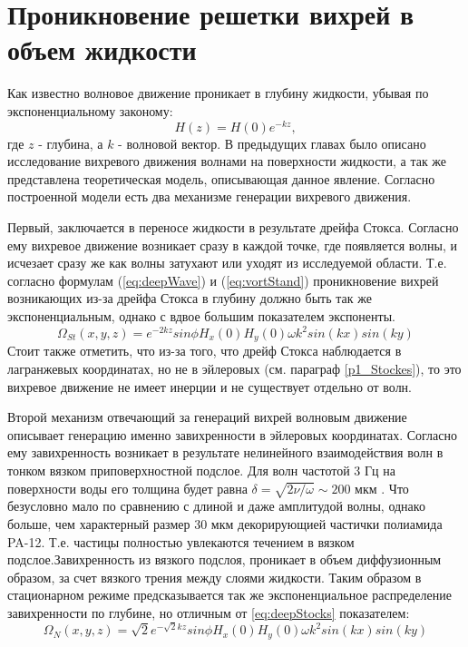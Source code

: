 \chapter{Проникновение решетки вихрей в объем жидкости} \label{chapt6}

Как известно \cite{land} волновое движение проникает в глубину жидкости, убывая по экспоненциальному законому:
\begin{equation}
 \label{eq:deepWave}
H(z) = H(0) e^{-kz},
\end{equation}
 где $z$ - глубина, а $k$ - волновой вектор. 
 В предыдущих главах было описано исследование вихревого движения волнами на поверхности жидкости, а так же представлена теоретическая модель, описывающая данное явление.
Согласно построенной модели есть два механизме генерации вихревого движения. 

	Первый, заключается в переносе жидкости в результате дрейфа Стокса. Согласно ему вихревое движение возникает сразу в каждой точке, где появляется волны, и исчезает сразу же как волны затухают или уходят из исследуемой области. Т.е. согласно формулам (\ref{eq:deepWave}) и (\ref{eq:vortStand}) проникновение вихрей возникающих из-за дрейфа Стокса в глубину должно быть так же экспоненциальным, однако с вдвое большим показателем экспоненты.
\begin{equation}
 \label{eq:deepStocks}
\Omega_{St}(x,y,z)  = e^{-2kz} sin \phi H_x(0) H_y(0) \omega k^2 sin(kx)sin(ky)
\end{equation}
Стоит также отметить, что из-за того, что дрейф Стокса наблюдается в лагранжевых координатах, но не в эйлеровых (см. параграф \ref{p1_Stockes}), то это вихревое движение не имеет инерции и не существует отдельно от волн.

	Второй механизм отвечающий за генераций вихрей волновым движение описывает генерацию именно завихренности в эйлеровых координатах. Согласно ему завихренность возникает в результате нелинейного взаимодействия волн в тонком вязком приповерхностной подслое. Для волн частотой 3 Гц на поверхности воды его толщина будет равна $\delta = \sqrt{2 \nu / \omega} \sim 200 $ мкм  \cite{FalkovichBook}. Что безусловно мало по сравнению с длиной и даже амплитудой волны, однако больше, чем характерный размер 30 мкм декорирующией частички полиамида PA-12. Т.е. частицы полностью увлекаются течением в вязком подслое.Завихренность из вязкого подслоя, проникает в объем диффузионным образом, за счет вязкого трения между слоями жидкости. Таким образом в стационарном режиме предсказывается так же экспоненциальное распределение завихренности по глубине, но отличным от \ref{eq:deepStocks} показателем:
\begin{equation}
 \label{eq:deepEyler}
\Omega_N(x,y,z)  = \sqrt{2}e^{-\sqrt{2}kz} sin \phi H_x(0) H_y(0) \omega k^2 sin(kx)sin(ky)
\end{equation}

